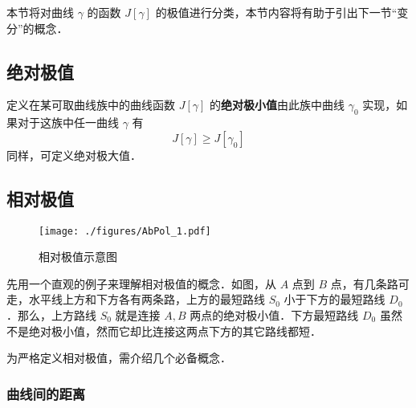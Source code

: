 

本节将对曲线 $\gamma$ 的函数 $J[\gamma]$ 的极值进行分类，本节内容将有助于引出下一节“变分”的概念．

\subsection{绝对极值}
定义在某可取曲线族中的曲线函数 $J[\gamma]$ 的\textbf{绝对极小值}由此族中曲线 $\gamma_0$ 实现，如果对于这族中任一曲线 $\gamma$ 有
\begin{equation}
J[\gamma]\geq J[\gamma_0]
\end{equation}
同样，可定义绝对极大值．
\subsection{相对极值}
\begin{figure}[ht]
\centering
\texttt{[image: ./figures/AbPol\_1.pdf]}
\caption{相对极值示意图} \label{AbPol_fig1}
\end{figure}

先用一个直观的例子来理解相对极值的概念．如图，从 $A$ 点到 $B$ 点，有几条路可走，水平线上方和下方各有两条路，上方的最短路线 $S_0$ 小于下方的最短路线 $D_0$ ．那么，上方路线 $S_0$ 就是连接 $A,B$ 两点的绝对极小值．下方最短路线 $D_0$ 虽然不是绝对极小值，然而它却比连接这两点下方的其它路线都短． 

为严格定义相对极值，需介绍几个必备概念．
\subsubsection{曲线间的距离}